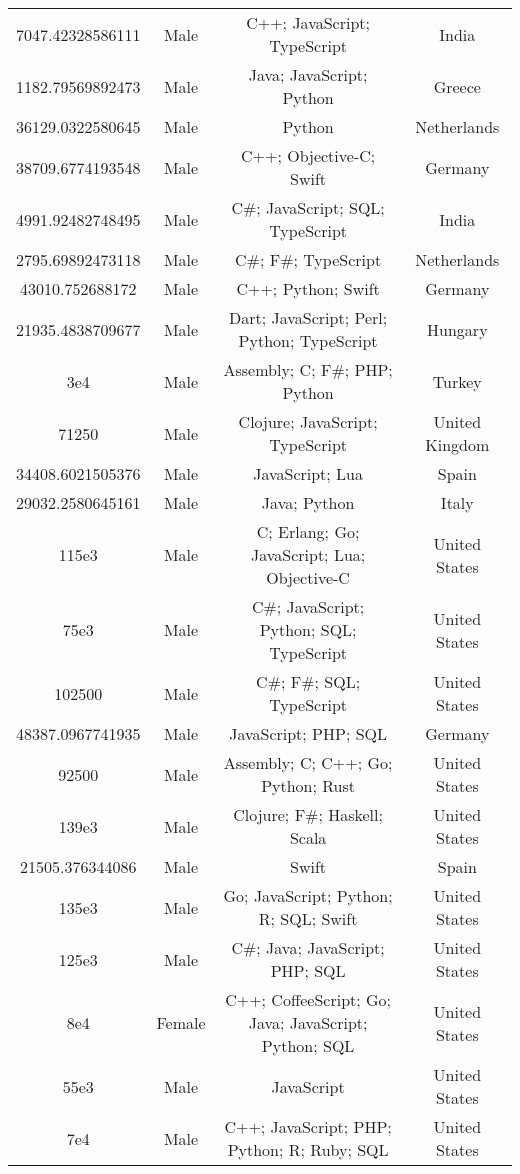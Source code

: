 \begin{center}
\begin{tabular}{ |c|c|c|c| }
7047.42328586111  &  Male  &  C++; JavaScript; TypeScript  &  India  \\ 
1182.79569892473  &  Male  &  Java; JavaScript; Python  &  Greece  \\ 
36129.0322580645  &  Male  &  Python  &  Netherlands  \\ 
38709.6774193548  &  Male  &  C++; Objective-C; Swift  &  Germany  \\ 
4991.92482748495  &  Male  &  C\#; JavaScript; SQL; TypeScript  &  India  \\ 
2795.69892473118  &  Male  &  C\#; F\#; TypeScript  &  Netherlands  \\ 
43010.752688172  &  Male  &  C++; Python; Swift  &  Germany  \\ 
21935.4838709677  &  Male  &  Dart; JavaScript; Perl; Python; TypeScript  &  Hungary  \\ 
3e4  &  Male  &  Assembly; C; F\#; PHP; Python  &  Turkey  \\ 
71250  &  Male  &  Clojure; JavaScript; TypeScript  &  United Kingdom  \\ 
34408.6021505376  &  Male  &  JavaScript; Lua  &  Spain  \\ 
29032.2580645161  &  Male  &  Java; Python  &  Italy  \\ 
115e3  &  Male  &  C; Erlang; Go; JavaScript; Lua; Objective-C  &  United States  \\ 
75e3  &  Male  &  C\#; JavaScript; Python; SQL; TypeScript  &  United States  \\ 
102500  &  Male  &  C\#; F\#; SQL; TypeScript  &  United States  \\ 
48387.0967741935  &  Male  &  JavaScript; PHP; SQL  &  Germany  \\ 
92500  &  Male  &  Assembly; C; C++; Go; Python; Rust  &  United States  \\ 
139e3  &  Male  &  Clojure; F\#; Haskell; Scala  &  United States  \\ 
21505.376344086  &  Male  &  Swift  &  Spain  \\ 
135e3  &  Male  &  Go; JavaScript; Python; R; SQL; Swift  &  United States  \\ 
125e3  &  Male  &  C\#; Java; JavaScript; PHP; SQL  &  United States  \\ 
8e4  &  Female  &  C++; CoffeeScript; Go; Java; JavaScript; Python; SQL  &  United States  \\ 
55e3  &  Male  &  JavaScript  &  United States  \\ 
7e4  &  Male  &  C++; JavaScript; PHP; Python; R; Ruby; SQL  &  United States  \\ 

\end{tabular}
\end{center}
